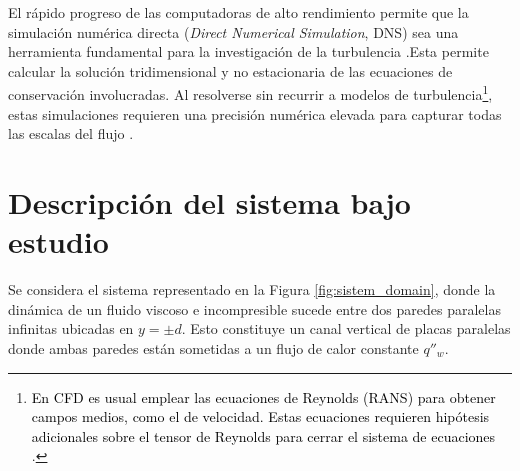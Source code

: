 El rápido progreso de las computadoras de alto rendimiento permite que la \linebreak simulación numérica directa (\textit{Direct Numerical Simulation}, DNS) sea una herramienta fundamental para la investigación de la turbulencia \cite{moin1998direct}.{\linebreak}Esta permite calcular la solución tridimensional y no estacionaria de las ecuaciones de conservación involucradas. Al resolverse sin recurrir a modelos de turbulencia\footnote{\textcolor{black}{En CFD es usual emplear las ecuaciones de Reynolds (RANS) para obtener campos medios, como el de velocidad. Estas ecuaciones requieren hipótesis adicionales sobre el tensor de Reynolds para cerrar el sistema de ecuaciones} \cite{durbin}.}, estas simulaciones requieren una precisión numérica elevada para capturar todas las escalas del flujo \cite{pope2001turbulent}.




\section{Descripción del sistema bajo estudio} \label{sec:descripcion}

Se considera el sistema representado en la Figura \ref{fig:sistem_domain}, donde la dinámica de un fluido viscoso e incompresible sucede entre dos paredes paralelas infinitas ubicadas en $y=\pm d$. Esto constituye un canal vertical de placas paralelas donde ambas paredes están sometidas a un flujo de calor constante $q''_w$.

